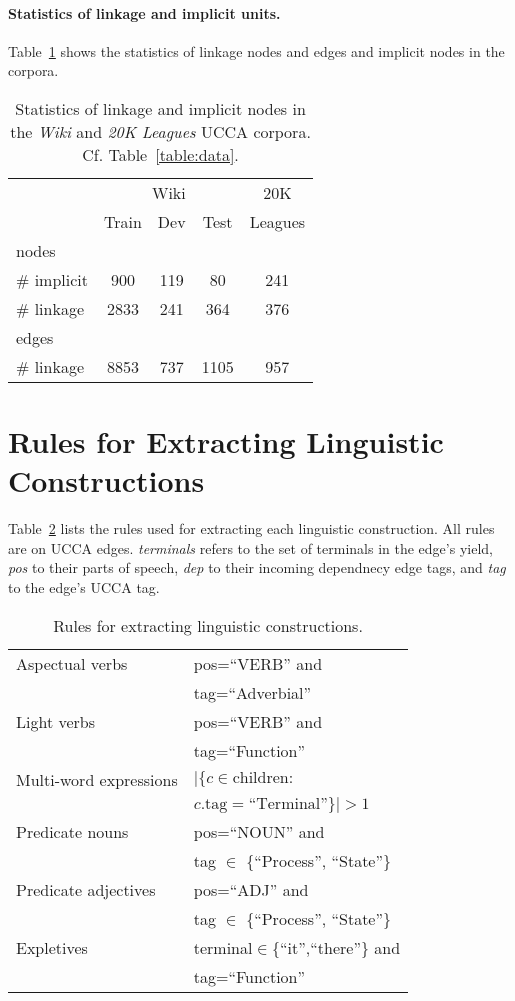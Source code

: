 \documentclass[11pt,a4paper]{article}
\newcommand{\tabref}[1]{Table~\ref{#1}}
\begin{document}
\paragraph{Statistics of linkage and implicit units.}

\tabref{table:data_linkage_implicit} shows the statistics of linkage nodes and edges and implicit nodes
in the corpora.

\begin{table}[ht]
\centering
\begin{tabular}{l|ccc|c}
& \multicolumn{3}{c|}{Wiki} & 20K \\
& \small Train & \small Dev & \small Test & Leagues \\
\hline
nodes \\
\# implicit & 900 & 119 & 80 & 241 \\
\# linkage & 2833 & 241 & 364 & 376 \\
\hline
edges \\
\# linkage & 8853 & 737 & 1105 & 957
\end{tabular}
\caption{Statistics of linkage and implicit nodes in the
\textit{Wiki} and \textit{20K Leagues} UCCA corpora.
Cf. \tabref{table:data}.
}
\label{table:data_linkage_implicit}
\end{table}

\section{Rules for Extracting Linguistic Constructions}
\label{appendix:constructions}

\tabref{tab:constructions_rules} lists the rules used for extracting each linguistic
construction. All rules are on UCCA edges.
\textit{terminals} refers to the set of terminals in the edge's yield,
\textit{pos} to their parts of speech,
\textit{dep} to their incoming dependnecy edge tags,
and \textit{tag} to the edge's UCCA tag.

\begin{table}
\begin{tabular}{ll}
Aspectual verbs & pos=``VERB'' and \\& tag=``Adverbial'' \\
Light verbs & pos=``VERB'' and \\& tag=``Function'' \\
Multi-word expressions & $|\{c\in\text{children}:$ \\
  & \hfill $c\text{.tag}=\text{``Terminal''}\}|>1$ \\
Predicate nouns & pos=``NOUN'' and \\& tag $\in$ \{``Process'', ``State''\} \\
Predicate adjectives & pos=``ADJ'' and \\& tag $\in$ \{``Process'', ``State''\} \\
Expletives & terminal$\in$\{``it'',``there''\} and \\& tag=``Function''
\end{tabular}
\caption{Rules for extracting linguistic constructions.}
\label{tab:constructions_rules}
\end{table}
\end{document}
